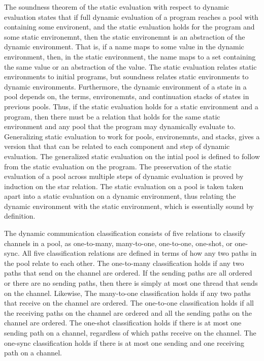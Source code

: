 \documentclass[letterpaper, 11pt]{extarticle}
\begin{document}
The soundness theorem of the static evaluation with respect to dynamic evaluation states that if full dynamic evaluation
of a program reaches a pool with containing some environent, and the static evaluation holds for the program and some
static environemnt, then the static environemnt is an abstraction of the dynamic environment. That is, if a name maps
to some value in the dynamic environment, then, in the static environment, the name maps to a set containing the same value
or an abstraction of the value. The static evaluation relates static environments to initial programs,
but soundness relates static environments
to dynamic environments. Furthermore, the dynamic environment of a state in a pool depends on, the terms, environemnts,
and continuation stacks of states in previous pools.
Thus, if the static evaluation holds for a static environment and a program,
then there must be a relation that holds for the same static environment and
any pool that the program may dynamically evaluate to. 
Generalizing static evaluation to work for pools, environemnts, and stacks, gives a version that
that can be related to each component and step of dynamic evaluation.
The generalized static evaluation on the intial pool is defined to follow from the static evaluation on the program.
The preservation of the static evaluation of a pool across multiple steps of dynamic evaluation is proved by induction on
the star relation. The static evaluation on a pool is taken taken apart into a static evaluation on a dynamic environment,
thus relating the dynamic environment with the static environment, which is essentially sound by definition. 


The dynamic communication classification consists of five relations to classify channels in a pool, as one-to-many,
many-to-one, one-to-one, one-shot, or one-sync. All five classification relations are defined in terms of how any two paths   
in the pool relate to each other. The one-to-many classification holds if any two paths that send on the channel are ordered. 
If the sending paths are all ordered or there are no sending paths, then there is simply at most one thread that
sends on the channel. Likewise, The many-to-one classification holds if any two paths that receive on the channel are ordered.
The one-to-one classification holds if all the receiving paths on the channel are ordered and all the sending paths on the
channel are ordered. The one-shot classification holds if there is at most one sending path on a channel, regardless
of which paths receive on the channel. The one-sync classification holds if there is at most one sending and one receiving path
on a channel.
\end{document}
